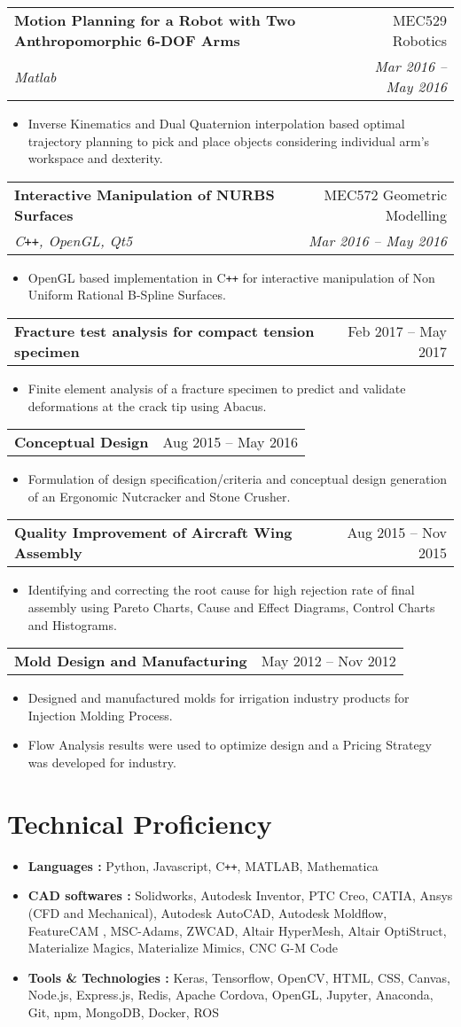 \documentclass[letterpaper,10pt]{article}
\makeatletter
\newcommand{\resumeHeading}[4]{
  \vspace{-1pt}
    \begin{tabular*}{0.97\textwidth}{l@{\extracolsep{\fill}}r}
      \textbf{#1} & #2 \vspace{-2pt}\\ \vspace{1pt}
      \textit{\small#3} & \textit{\small #4} \\
    \end{tabular*}
}
\newcommand{\resumeHeadingwithDate}[2]{
	\vspace{-1pt}
	\begin{tabular*}{0.97\textwidth}{l@{\extracolsep{\fill}}r}
		\textbf{#1} & #2 \vspace{-2pt}\\
	\end{tabular*}
	\vspace{+2pt}
}
\newcommand{\resumeSection}[1]{
\vspace{-12pt}
\section{\textbf{#1}}
}
\newcommand{\resumeItemListStart}{
\vspace{-7pt}
\begin{itemize}[leftmargin=14pt]
}
\newcommand{\resumeItemListEnd}{
\vspace{+7pt}
\end{itemize}
}
\newcommand{\resumeItem}[1]{
  \item\small{
      {#1 \vspace{-7pt}
      }
  }
}
\makeatother
\begin{document}
	\vspace{-2pt}
	\resumeHeading{Motion Planning for a Robot with Two Anthropomorphic 6-DOF Arms}{MEC529 Robotics}{Matlab}{Mar 2016 -- May 2016}
	\resumeItemListStart
	\resumeItem{Inverse Kinematics and Dual Quaternion interpolation based optimal trajectory planning to pick and place objects considering individual arm's workspace and dexterity.}
	\resumeItemListEnd
	
	\vspace{-2pt}
	\resumeHeading{Interactive Manipulation of NURBS Surfaces}{MEC572 Geometric Modelling}{C\texttt{++}, OpenGL, Qt5}{Mar 2016 -- May 2016}
	\resumeItemListStart
	\resumeItem{OpenGL based implementation in C\texttt{++} for interactive manipulation of Non Uniform Rational B-Spline Surfaces.}
	\resumeItemListEnd
	
	\resumeHeadingwithDate{Fracture test analysis for compact tension specimen}{Feb 2017 -- May 2017}
	\resumeItemListStart
	\resumeItem{Finite element analysis of a fracture specimen to predict and validate deformations at the crack tip using Abacus.}
	\resumeItemListEnd
	
	\vspace{-4pt}
	\resumeHeadingwithDate{Conceptual Design}{Aug 2015 -- May 2016}
	\resumeItemListStart
	\resumeItem{Formulation of design specification/criteria and conceptual design generation of an Ergonomic Nutcracker and Stone Crusher.}
	\resumeItemListEnd
	
	\vspace{-4pt}
	\resumeHeadingwithDate{Quality Improvement of Aircraft Wing Assembly}{Aug 2015 -- Nov 2015}
	\resumeItemListStart
	\resumeItem{Identifying and correcting the root cause for high rejection rate of final assembly using Pareto Charts, Cause and Effect Diagrams, Control Charts and Histograms.}
	\resumeItemListEnd
	
	\vspace{-4pt}
	\resumeHeadingwithDate{Mold Design and Manufacturing}{May 2012 -- Nov 2012}
	\resumeItemListStart
	\resumeItem{Designed and manufactured molds for irrigation industry products for Injection Molding Process.}
	\resumeItem{Flow Analysis results were used to optimize design and a Pricing Strategy was developed for industry.}
	\resumeItemListEnd
    
    
    
\resumeSection{Technical Proficiency}
    \vspace{+7pt}
    \resumeItemListStart
    \resumeItem{\textbf{Languages :} Python, Javascript, C\texttt{++}, MATLAB, Mathematica}
    \resumeItem{\textbf{CAD softwares :} Solidworks, Autodesk Inventor, PTC Creo, CATIA, Ansys (CFD and Mechanical), Autodesk AutoCAD, Autodesk Moldflow, FeatureCAM , MSC-Adams, ZWCAD, Altair HyperMesh, Altair OptiStruct, Materialize Magics, Materialize Mimics, CNC G-M Code}
    \resumeItem{\textbf{Tools \& Technologies :} Keras, Tensorflow, OpenCV, HTML, CSS, Canvas, Node.js, Express.js, Redis, Apache Cordova, OpenGL, Jupyter, Anaconda, Git, npm, MongoDB, Docker, ROS}
    \resumeItemListEnd
    
\end{document}
